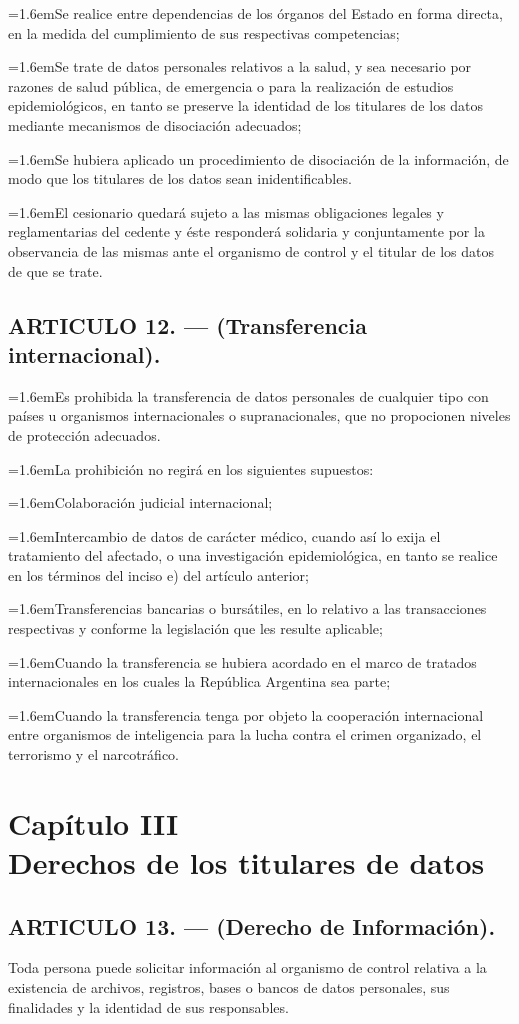 \documentclass[10pt,a4paper]{article}
\newcommand{\capitulo}[2]{\section[#1 --- #2]{#1\\[2pt]#2}}
\newcommand{\articulo}[1]{\subsection{#1}}
\newcommand{\inciso}[2]{\par{\hangindent=1.6em\hangafter=1\makebox[1.6em][l]{#1}#2\par}}
\begin{document}
\inciso{c)}{Se realice entre dependencias de los órganos del Estado en forma directa, en la medida del cumplimiento de sus respectivas competencias;}

\inciso{d)}{Se trate de datos personales relativos a la salud, y sea necesario por razones de salud pública, de emergencia o para la realización de estudios epidemiológicos, en tanto se preserve la identidad de los titulares de los datos mediante mecanismos de disociación adecuados;}

\inciso{e)}{Se hubiera aplicado un procedimiento de disociación de la información, de modo que los titulares de los datos sean inidentificables.}

\inciso{4.}{El cesionario quedará sujeto a las mismas obligaciones legales y reglamentarias del cedente y éste responderá solidaria y conjuntamente por la observancia de las mismas ante el organismo de control y el titular de los datos de que se trate.}

\articulo{ARTICULO 12. — (Transferencia internacional).}
\inciso{1.}{Es prohibida la transferencia de datos personales de cualquier tipo con países u organismos internacionales o supranacionales, que no propocionen niveles de protección adecuados.}

\inciso{2.}{La prohibición no regirá en los siguientes supuestos:}

\inciso{a)}{Colaboración judicial internacional;}

\inciso{b)}{Intercambio de datos de carácter médico, cuando así lo exija el tratamiento del afectado, o una investigación epidemiológica, en tanto se realice en los términos del inciso e) del artículo anterior;}

\inciso{c)}{Transferencias bancarias o bursátiles, en lo relativo a las transacciones respectivas y conforme la legislación que les resulte aplicable;}

\inciso{d)}{Cuando la transferencia se hubiera acordado en el marco de tratados internacionales en los cuales la República Argentina sea parte;}

\inciso{e)}{Cuando la transferencia tenga por objeto la cooperación internacional entre organismos de inteligencia para la lucha contra el crimen organizado, el terrorismo y el narcotráfico.}

\capitulo{Capítulo III}{Derechos de los titulares de datos}
\articulo{ARTICULO 13. — (Derecho de Información).}
Toda persona puede solicitar información al organismo de control relativa a la existencia de archivos, registros, bases o bancos de datos personales, sus finalidades y la identidad de sus responsables.
\end{document}

